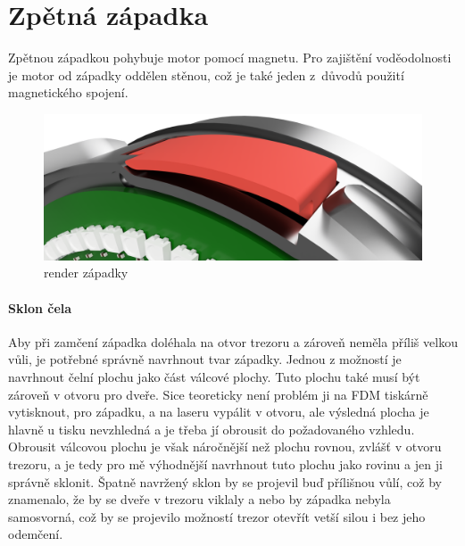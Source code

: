\section{Zpětná západka}

    Zpětnou západkou pohybuje motor pomocí magnetu. Pro zajištění voděodolnosti je motor od západky oddělen stěnou, což je také jeden z~důvodů použití magne\-tic\-ké\-ho spojení.

\begin{figure}[h]
    \centering
    \includegraphics[width=\textwidth]{kapitoly/obrazky/E4/zapadka/render.png}
    \caption{render západky}

    \label{fig:E4-zapadka}
\end{figure}

\clearpage
\newpage

\paragraph{Sklon čela}

Aby při zamčení západka doléhala na otvor trezoru a zároveň neměla příliš velkou vůli, je potřebné správně navrhnout tvar západky.
Jednou z možností je navrhnout čelní plochu jako část válcové plochy. Tuto plochu také musí být zároveň v otvoru pro dveře.  %
Sice teoreticky není problém ji na FDM tiskárně vytisknout, pro západku, a na laseru vypálit v otvoru, ale výsledná plocha je hlavně u tisku 
nevzhledná a je třeba jí obrousit do požadovaného vzhledu. Obrousit válcovou plochu je však náročnější než plochu rovnou, zvlášť v otvoru trezoru, 
a je tedy pro mě výhodnější navrhnout tuto plochu jako rovinu a jen ji správně sklonit. Špatně navržený sklon by se projevil buď přílišnou vůlí, 
což by znamenalo, že by se dveře v trezoru viklaly a nebo by západka nebyla samosvorná, což by se projevilo možností trezor otevřít vetší silou 
i bez jeho odemčení.

